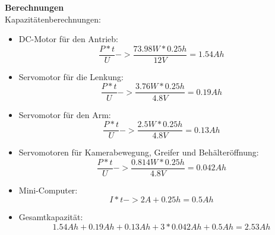 \textbf{Berechnungen}\\[0.2cm]
Kapazitätenberechnungen:
\begin{itemize}
\item DC-Motor für den Antrieb:
\[
\frac{P*t}{U} -> \frac{73.98W*0.25h}{12V}= 1.54 Ah
\]
\item Servomotor für die Lenkung:
\[
\frac{P*t}{U} -> \frac{3.76W*0.25h}{4.8V}= 0.19 Ah
\]
\item Servomotor für den Arm:
\[
\frac{P*t}{U} -> \frac{2.5W*0.25h}{4.8V}= 0.13 Ah
\]
\item Servomotoren für Kamerabewegung, Greifer und Behälteröffnung:
\[
\frac{P*t}{U} -> \frac{0.814W*0.25h}{4.8V}= 0.042 Ah
\]
\item Mini-Computer:
\[
I*t -> 2A+0.25h = 0.5 Ah
\]
\item Gesamtkapazität:
\[
1.54Ah+0.19Ah+0.13Ah+3*0.042Ah+0.5Ah = 2.53Ah
\]

\end{itemize}
